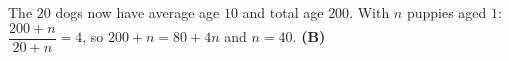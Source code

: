The $20$ dogs now have average age $10$ and total age $200$. With $n$ puppies aged $1$: $\dfrac{200+n}{20+n}=4$, so $200+n=80+4n$ and $n=40$. \textbf{(B)}
